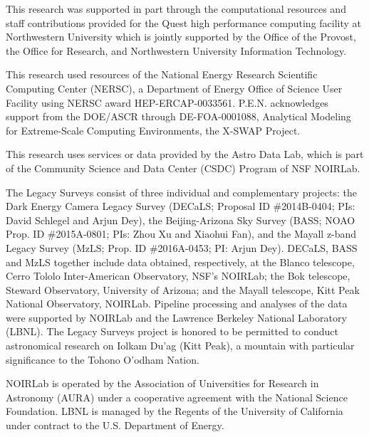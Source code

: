 \documentclass[twocolumn]{aastex631}
\begin{document}
\begin{CJK*}{UTF8}{gbsn}
This research was supported in part through the computational resources and staff contributions provided for the Quest high performance computing facility at Northwestern University which is jointly supported by the Office of the Provost, the Office for Research, and Northwestern University Information Technology. 

This research used resources of the National Energy Research Scientific Computing Center (NERSC), a Department of Energy Office of Science User Facility using NERSC award HEP-ERCAP-0033561. P.E.N. acknowledges support from the DOE/ASCR
through DE-FOA-0001088, Analytical Modeling for Extreme-Scale Computing Environments, the X-SWAP Project. 

This research uses services or data provided by the Astro Data Lab, which is part of the Community Science and Data Center (CSDC) Program of NSF NOIRLab. 


The Legacy Surveys consist of three individual and complementary projects: the Dark Energy Camera Legacy Survey (DECaLS; Proposal ID \#2014B-0404; PIs: David Schlegel and Arjun Dey), the Beijing-Arizona Sky Survey (BASS; NOAO Prop. ID \#2015A-0801; PIs: Zhou Xu and Xiaohui Fan), and the Mayall z-band Legacy Survey (MzLS; Prop. ID \#2016A-0453; PI: Arjun Dey). DECaLS, BASS and MzLS together include data obtained, respectively, at the Blanco telescope, Cerro Tololo Inter-American Observatory, NSF's NOIRLab; the Bok telescope, Steward Observatory, University of Arizona; and the Mayall telescope, Kitt Peak National Observatory, NOIRLab. Pipeline processing and analyses of the data were supported by NOIRLab and the Lawrence Berkeley National Laboratory (LBNL). The Legacy Surveys project is honored to be permitted to conduct astronomical research on Iolkam Du'ag (Kitt Peak), a mountain with particular significance to the Tohono O'odham Nation.

NOIRLab is operated by the Association of Universities for Research in Astronomy (AURA) under a cooperative agreement with the National Science Foundation. LBNL is managed by the Regents of the University of California under contract to the U.S. Department of Energy.


\end{CJK*}
\end{document}
